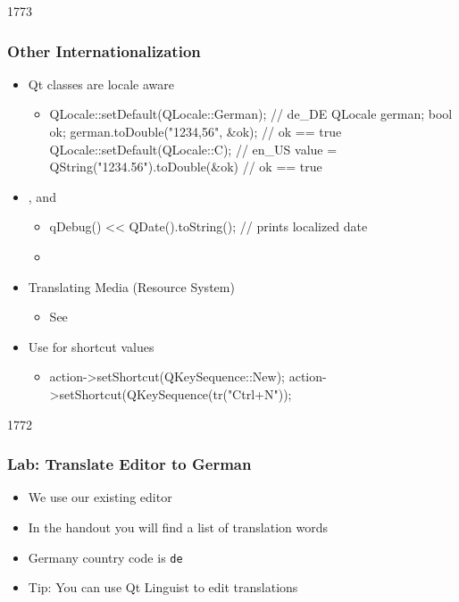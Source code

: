 \begin{slide}[fragile]{1773}\frametitle{Other Internationalization}
  \begin{itemize}
  \item Qt classes are locale aware
    \begin{itemize}
    \item[] \begin{cpp}
QLocale::setDefault(QLocale::German); // de_DE
QLocale german; bool ok;
german.toDouble("1234,56", &ok); // ok == true
QLocale::setDefault(QLocale::C); // en_US
value = QString("1234.56").toDouble(&ok) // ok == true
     \end{cpp}
   \end{itemize}
  \item {},  and 
    \begin{itemize}
    \item[] \begin{cpp}
qDebug() << QDate().toString();  // prints localized date
      \end{cpp}
   \item {}

    \end{itemize}
 \item Translating Media (Resource System)
   \begin{itemize}
   \item See 
   \end{itemize}
  \item Use  for shortcut values
    \begin{itemize}
    \item []\begin{cpp}
action->setShortcut(QKeySequence::New);
action->setShortcut(QKeySequence(tr("Ctrl+N"));
      \end{cpp}
    \end{itemize}
  \end{itemize}
\end{slide}


\begin{slide}{1772}
  \frametitle{Lab: Translate Editor to German}
  \begin{itemize}
  \item We use our existing editor
  \item In the handout you will find a list of translation words
  \item Germany country code is \texttt{de}
  \item Tip: You can use Qt Linguist to edit translations
  \end{itemize}
\end{slide}
